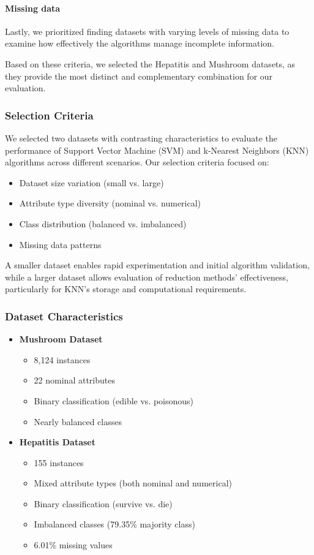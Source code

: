 \paragraph{Missing data} Lastly, we prioritized finding datasets with varying levels of missing data to examine how effectively the algorithms manage incomplete information.

Based on these criteria, we selected the Hepatitis and Mushroom datasets, as they provide the most distinct and complementary combination for our evaluation.
\subsubsection{Selection Criteria}
We selected two datasets with contrasting characteristics to evaluate the performance of Support Vector Machine (SVM) and k-Nearest Neighbors (KNN) algorithms across different scenarios. Our selection criteria focused on:

\begin{itemize}
    \item Dataset size variation (small vs. large)
    \item Attribute type diversity (nominal vs. numerical)
    \item Class distribution (balanced vs. imbalanced)
    \item Missing data patterns
\end{itemize}

A smaller dataset enables rapid experimentation and initial algorithm validation, while a larger dataset allows evaluation of reduction methods' effectiveness, particularly for KNN's storage and computational requirements.

\subsubsection{Dataset Characteristics}

\begin{itemize}
    \item \textbf{Mushroom Dataset}
    \begin{itemize}
        \item 8,124 instances
        \item 22 nominal attributes
        \item Binary classification (edible vs. poisonous)
        \item Nearly balanced classes
    \end{itemize}
    
    \item \textbf{Hepatitis Dataset}
    \begin{itemize}
        \item 155 instances
        \item Mixed attribute types (both nominal and numerical)
        \item Binary classification (survive vs. die)
        \item Imbalanced classes (79.35\% majority class)
        \item 6.01\% missing values
    \end{itemize}
\end{itemize}

